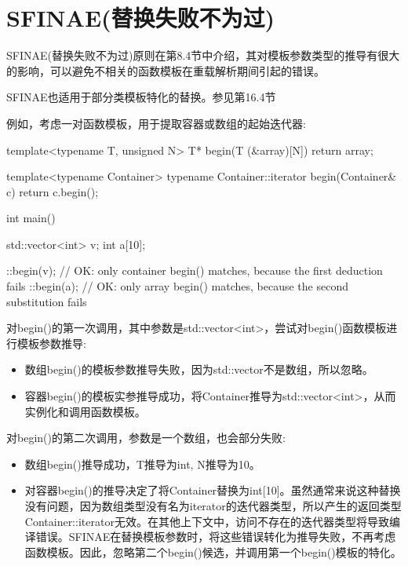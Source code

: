 \section{SFINAE(替换失败不为过)}


SFINAE(替换失败不为过)原则在第8.4节中介绍，其对模板参数类型的推导有很大的影响，可以避免不相关的函数模板在重载解析期间引起的错误。

\begin{notice}
SFINAE也适用于部分类模板特化的替换。参见第16.4节
\end{notice}

例如，考虑一对函数模板，用于提取容器或数组的起始迭代器:

\begin{cpp}
template<typename T, unsigned N>
T* begin(T (&array)[N])
{
	return array;
}

template<typename Container>
typename Container::iterator begin(Container& c)
{
	return c.begin();
}

int main()
{
	std::vector<int> v;
	int a[10];
	
	::begin(v); // OK: only container begin() matches, because the first deduction fails
	::begin(a); // OK: only array begin() matches, because the second substitution fails
}
\end{cpp}

对begin()的第一次调用，其中参数是std::vector<int>，尝试对begin()函数模板进行模板参数推导:

\begin{itemize}
\item 
数组begin()的模板参数推导失败，因为std::vector不是数组，所以忽略。

\item 
容器begin()的模板实参推导成功，将Container推导为std::vector<int>，从而实例化和调用函数模板。
\end{itemize}

对begin()的第二次调用，参数是一个数组，也会部分失败:

\begin{itemize}
\item 
数组begin()推导成功，T推导为int, N推导为10。

\item 
对容器begin()的推导决定了将Container替换为int[10]。虽然通常来说这种替换没有问题，因为数组类型没有名为iterator的迭代器类型，所以产生的返回类型Container::iterator无效。在其他上下文中，访问不存在的迭代器类型将导致编译错误。SFINAE在替换模板参数时，将这些错误转化为推导失败，不再考虑函数模板。因此，忽略第二个begin()候选，并调用第一个begin()模板的特化。
\end{itemize}

